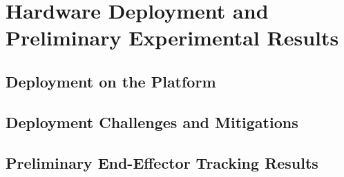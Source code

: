 \chapter{Hardware Deployment and Preliminary Experimental Results}
\label{ch:hardware}

\section{Deployment on the \hero{} Platform}
\label{sec:hw-deployment}


\section{Deployment Challenges and Mitigations}
\label{sec:hw-challenges}


\section{Preliminary End-Effector Tracking Results}
\label{sec:hw-results}

